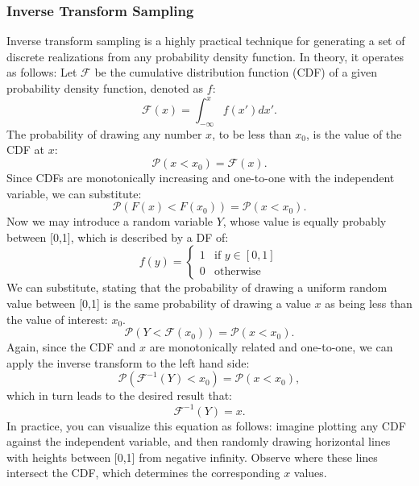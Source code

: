 \subsubsection*{Inverse Transform Sampling}
Inverse transform sampling is a highly practical technique for generating a set of discrete realizations from any probability density function. In theory, it operates as follows: Let $\mathcal{F}$ be the cumulative distribution function (CDF) of a given probability density function, denoted as $f$:
\begin{equation}
    \mathcal{F}\left(x\right) = \int_{-\infty}^{x} f\left(x'\right)dx'.
\end{equation}
The probability of drawing any number $x$, to be less than $x_0$, is the value of the CDF at $x$:
\begin{equation}
    \mathcal{P}\left(x < x_0\right) = \mathcal{F}\left(x\right).
\end{equation}
Since CDFs are monotonically increasing and one-to-one with the independent variable, we can substitute:
\begin{equation}
 \mathcal{P}(F(x)<F(x_0)) = \mathcal{P}(x<x_0).
\end{equation}
Now we may introduce a random variable $Y$, whose value is equally probably between [0,1], which is described by a DF of:
\begin{equation}
f(y) = \begin{cases} 1 & \text{if } y \in [0,1] \\ 0 & \text{otherwise} \end{cases}
\end{equation}    
We can substitute, stating that the probability of drawing a uniform random value between [0,1] is the same probability of drawing a value $x$ as being less than the value of interest: $x_0$.
\begin{equation}
    \mathcal{P}\left(Y<\mathcal{F}(x_0)\right) = \mathcal{P}(x<x_0).
\end{equation}
Again, since the CDF and $x$ are monotonically related and one-to-one, we can apply the inverse transform to the left hand side:
\begin{equation}
\mathcal{P}\left(\mathcal{F}^{-1}(Y)<x_0\right) = \mathcal{P}(x<x_0),
\end{equation}
which in turn leads to the desired result that:
\begin{equation}
    \mathcal{F}^{-1}\left(Y\right) = x.
\end{equation}
In practice, you can visualize this equation as follows: imagine plotting any CDF against the independent variable, and then randomly drawing horizontal lines with heights between [0,1] from negative infinity. Observe where these lines intersect the CDF, which determines the corresponding $x$ values. 


